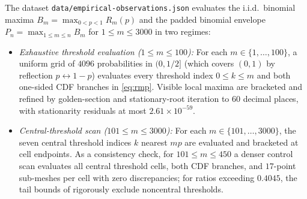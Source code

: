 \documentclass[11pt]{article}
\numberwithin{equation}{section}
\theoremstyle{definition}
\theoremstyle{remark}
\begin{document}
The dataset \texttt{data/\allowbreak empirical-observations.json} evaluates the i.i.d.\
binomial maxima $B_m=\max_{0<p<1}R_m(p)$ and the padded binomial envelope
$P_n=\max_{1\le m\le n}B_m$ for $1\le m\le3000$ in two regimes:
\begin{itemize}[leftmargin=2em]
\item \emph{Exhaustive threshold evaluation ($1\le m\le100$):} For each
$m\in\{1,\ldots,100\}$, a uniform grid of $4096$ probabilities in $(0,1/2]$
(which covers $(0,1)$ by reflection $p\leftrightarrow 1-p$) evaluates every
threshold index $0\le k\le m$ and both one-sided CDF branches in
\eqref{eq:rmp}. Visible local maxima are bracketed and refined by golden-section
and stationary-root iteration to $60$ decimal places, with stationarity
residuals at most $2.61\times10^{-59}$.
\item \emph{Central-threshold scan ($101\le m\le3000$):} For each
$m\in\{101,\ldots,3000\}$, the seven central threshold indices $k$ nearest
$mp$ are evaluated and bracketed at cell endpoints. As a consistency check,
for $101\le m\le450$ a denser control scan evaluates all central threshold
cells, both CDF branches, and $17$-point sub-meshes per cell with zero
discrepancies; for ratios exceeding $0.4045$, the tail bounds of
\citet{Schulz2016} rigorously exclude noncentral thresholds.
\end{itemize}
\end{document}
